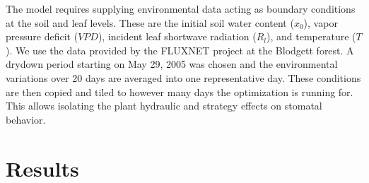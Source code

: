 \documentclass[utf8]{frontiersSCNS} %
\begin{document}
The model requires supplying environmental data acting as boundary conditions at the soil and leaf levels. These are the initial soil water content ($x_0$), vapor pressure deficit ($VPD$), incident leaf shortwave radiation ($R_l$), and temperature ($T$). We use the data provided by the FLUXNET project at the Blodgett forest. A drydown period starting on May 29, 2005 was chosen and the environmental variations over 20 days are averaged into one representative day. These conditions are then copied and tiled to however many days the optimization is running for. This allows isolating the plant hydraulic and strategy effects on stomatal behavior.

\section{Results}
\end{document}
